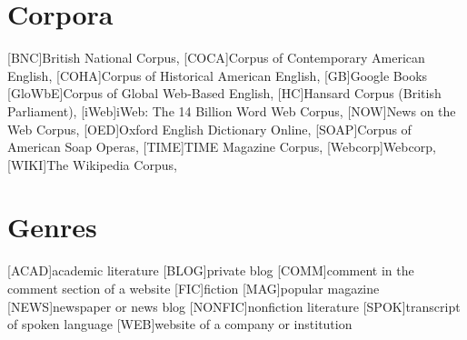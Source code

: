 \addchap{\lsAbbreviationsTitle}

\section*{Corpora}

\begin{acronym}[Webcorp]\itemsep-1pt
	[\textnormal{BNC}]{British National Corpus, \citet{Davies.2004}} %
	[\textnormal{COCA}]{Corpus of Contemporary American English, \citet{Davies.2008}} %
	[\textnormal{COHA}]{Corpus of Historical American English, \citet{Davies.2010}} %
	[\textnormal{GB}]{Google Books}
	[\textnormal{GloWbE}]{Corpus of Global Web-Based English, \citet{Davies.2013}} %
	[\textnormal{HC}]{Hansard Corpus (British Parliament), \citet{Davies.2015b}} %
	[\textnormal{iWeb}]{iWeb: The 14 Billion Word Web Corpus, \citet{Davies.2018}} %
	[\textnormal{NOW}]{News on the Web Corpus, \citet{Davies.2016}} %
	[\textnormal{OED}]{Oxford English Dictionary Online, }
	[\textnormal{SOAP}]{Corpus of American Soap Operas, \citet{Davies.2011}} %
	[\textnormal{TIME}]{TIME Magazine Corpus, \citet{Davies.2007}} %
	[\textnormal{Webcorp}]{Webcorp, \citet{Renouf.2006}}
	[\textnormal{WIKI}]{The Wikipedia Corpus, \citet{Davies.2015}} %
\end{acronym}
\section*{Genres}
\begin{acronym}[NONFIC]\itemsep-1pt
	[\textnormal{ACAD}]{academic literature}
	[\textnormal{BLOG}]{private blog}
	[\textnormal{COMM}]{comment in the comment section of a website}
	[\textnormal{FIC}]{fiction}
	[\textnormal{MAG}]{popular magazine}
	[\textnormal{NEWS}]{newspaper or news blog}
	[\textnormal{NONFIC}]{nonfiction literature}
	[\textnormal{SPOK}]{transcript of spoken language}
	[\textnormal{WEB}]{website of a company or institution}
\end{acronym}
